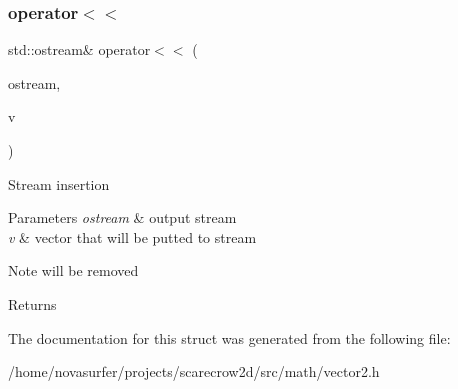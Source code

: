 \subsubsection{\texorpdfstring{operator$<$$<$}{operator<<}}
{\footnotesize\ttfamily std\+::ostream\& operator$<$$<$ (\begin{DoxyParamCaption}\item[{std\+::ostream \&}]{ostream,  }\item[{const \hyperlink{structmath_1_1vec2}{vec2} \&}]{v }\end{DoxyParamCaption})\hspace{0.3cm}{\ttfamily [friend]}}

Stream insertion 
\begin{DoxyParams}{Parameters}
{\em ostream} & output stream \\
\hline
{\em v} & vector that will be putted to stream \\
\hline
\end{DoxyParams}
\begin{DoxyNote}{Note}
will be removed 
\end{DoxyNote}
\begin{DoxyReturn}{Returns}

\end{DoxyReturn}


The documentation for this struct was generated from the following file\+:\begin{DoxyCompactItemize}
\item 
/home/novasurfer/projects/scarecrow2d/src/math/vector2.\+h\end{DoxyCompactItemize}
